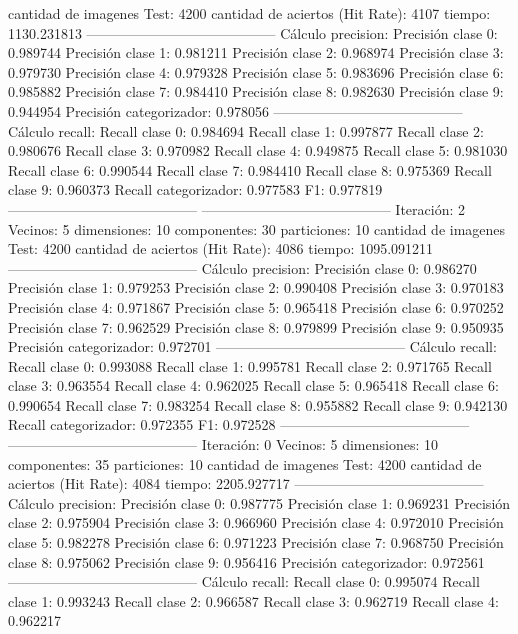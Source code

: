 cantidad de imagenes Test: 4200
cantidad de aciertos (Hit Rate): 4107
tiempo: 1130.231813
-----------------------------------------
Cálculo precision: 
Precisión clase 0: 0.989744
Precisión clase 1: 0.981211
Precisión clase 2: 0.968974
Precisión clase 3: 0.979730
Precisión clase 4: 0.979328
Precisión clase 5: 0.983696
Precisión clase 6: 0.985882
Precisión clase 7: 0.984410
Precisión clase 8: 0.982630
Precisión clase 9: 0.944954
Precisión categorizador: 0.978056
-----------------------------------------
Cálculo recall: 
Recall clase 0: 0.984694
Recall clase 1: 0.997877
Recall clase 2: 0.980676
Recall clase 3: 0.970982
Recall clase 4: 0.949875
Recall clase 5: 0.981030
Recall clase 6: 0.990544
Recall clase 7: 0.984410
Recall clase 8: 0.975369
Recall clase 9: 0.960373
Recall categorizador: 0.977583
F1: 0.977819
-----------------------------------------
-----------------------------------------
Iteración: 2
Vecinos: 5
dimensiones: 10
componentes: 30
particiones: 10
cantidad de imagenes Test: 4200
cantidad de aciertos (Hit Rate): 4086
tiempo: 1095.091211
-----------------------------------------
Cálculo precision: 
Precisión clase 0: 0.986270
Precisión clase 1: 0.979253
Precisión clase 2: 0.990408
Precisión clase 3: 0.970183
Precisión clase 4: 0.971867
Precisión clase 5: 0.965418
Precisión clase 6: 0.970252
Precisión clase 7: 0.962529
Precisión clase 8: 0.979899
Precisión clase 9: 0.950935
Precisión categorizador: 0.972701
-----------------------------------------
Cálculo recall: 
Recall clase 0: 0.993088
Recall clase 1: 0.995781
Recall clase 2: 0.971765
Recall clase 3: 0.963554
Recall clase 4: 0.962025
Recall clase 5: 0.965418
Recall clase 6: 0.990654
Recall clase 7: 0.983254
Recall clase 8: 0.955882
Recall clase 9: 0.942130
Recall categorizador: 0.972355
F1: 0.972528
-----------------------------------------
-----------------------------------------
Iteración: 0
Vecinos: 5
dimensiones: 10
componentes: 35
particiones: 10
cantidad de imagenes Test: 4200
cantidad de aciertos (Hit Rate): 4084
tiempo: 2205.927717
-----------------------------------------
Cálculo precision: 
Precisión clase 0: 0.987775
Precisión clase 1: 0.969231
Precisión clase 2: 0.975904
Precisión clase 3: 0.966960
Precisión clase 4: 0.972010
Precisión clase 5: 0.982278
Precisión clase 6: 0.971223
Precisión clase 7: 0.968750
Precisión clase 8: 0.975062
Precisión clase 9: 0.956416
Precisión categorizador: 0.972561
-----------------------------------------
Cálculo recall: 
Recall clase 0: 0.995074
Recall clase 1: 0.993243
Recall clase 2: 0.966587
Recall clase 3: 0.962719
Recall clase 4: 0.962217
